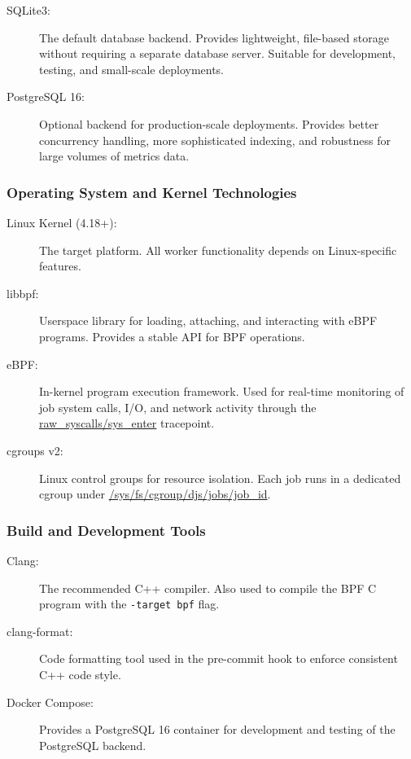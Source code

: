 \begin{description}
	\item[SQLite3:] The default database backend. Provides lightweight, file-based storage without requiring a separate database server. Suitable for development, testing, and small-scale deployments.

	\item[PostgreSQL 16:] Optional backend for production-scale deployments. Provides better concurrency handling, more sophisticated indexing, and robustness for large volumes of metrics data.
\end{description}

\subsubsection{Operating System and Kernel Technologies}

\begin{description}
	\item[Linux Kernel (4.18+):] The target platform. All worker functionality depends on Linux-specific features.

	\item[libbpf:] Userspace library for loading, attaching, and interacting with eBPF programs. Provides a stable API for BPF operations.

	\item[eBPF:] In-kernel program execution framework. Used for real-time monitoring of job system calls, I/O, and network activity through the \url{raw_syscalls/sys_enter} tracepoint.

	\item[cgroups v2:] Linux control groups for resource isolation. Each job runs in a dedicated cgroup under \url{/sys/fs/cgroup/djs/jobs/job_id}.
\end{description}

\subsubsection{Build and Development Tools}

\begin{description}
	\item[Clang:] The recommended C++ compiler. Also used to compile the BPF C program with the \texttt{-target bpf} flag.

	\item[clang-format:] Code formatting tool used in the pre-commit hook to enforce consistent C++ code style.

	\item[Docker Compose:] Provides a PostgreSQL 16 container for development and testing of the PostgreSQL backend.
\end{description}

